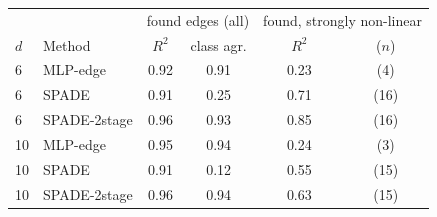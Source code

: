 \begin{tabular}{llcccc}
\toprule
 & & \multicolumn{2}{c}{found edges (all)} & \multicolumn{2}{c}{found, strongly non-linear} \\
$d$ & Method & $R^2$ & class agr. & $R^2$ & ($n$) \\ \midrule
6 & MLP-edge & 0.92 & 0.91 & 0.23 & (4) \\
6 & SPADE & 0.91 & 0.25 & 0.71 & (16) \\
6 & SPADE-2stage & 0.96 & 0.93 & 0.85 & (16) \\
10 & MLP-edge & 0.95 & 0.94 & 0.24 & (3) \\
10 & SPADE & 0.91 & 0.12 & 0.55 & (15) \\
10 & SPADE-2stage & 0.96 & 0.94 & 0.63 & (15) \\
\bottomrule
\end{tabular}
